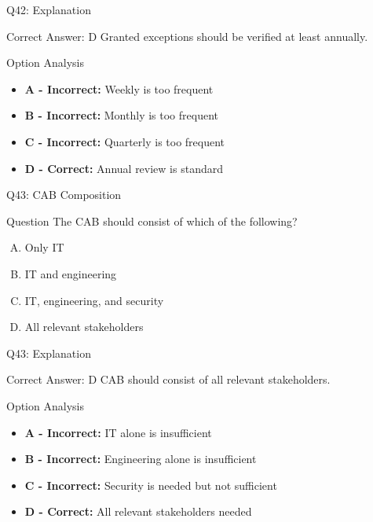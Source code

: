 \documentclass{beamer}
\begin{document}
	\begin{frame}{Q42: Explanation}
		\begin{block}{Correct Answer: D}
			Granted exceptions should be verified at least annually.
		\end{block}
		\begin{block}{Option Analysis}
			\begin{itemize}
				\item \textbf{A - Incorrect:} Weekly is too frequent
				\item \textbf{B - Incorrect:} Monthly is too frequent
				\item \textbf{C - Incorrect:} Quarterly is too frequent
				\item \textbf{D - Correct:} Annual review is standard
			\end{itemize}
		\end{block}
	\end{frame}
	
	\begin{frame}{Q43: CAB Composition}
		\begin{block}{Question}
			The CAB should consist of which of the following?
		\end{block}
		\begin{enumerate}[(A)]
			\item Only IT
			\item IT and engineering
			\item IT, engineering, and security
			\item All relevant stakeholders
		\end{enumerate}
	\end{frame}
	
	\begin{frame}{Q43: Explanation}
		\begin{block}{Correct Answer: D}
			CAB should consist of all relevant stakeholders.
		\end{block}
		\begin{block}{Option Analysis}
			\begin{itemize}
				\item \textbf{A - Incorrect:} IT alone is insufficient
				\item \textbf{B - Incorrect:} Engineering alone is insufficient
				\item \textbf{C - Incorrect:} Security is needed but not sufficient
				\item \textbf{D - Correct:} All relevant stakeholders needed
			\end{itemize}
		\end{block}
	\end{frame}
	
\end{document}
